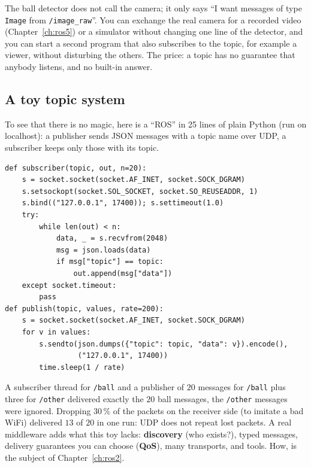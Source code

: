 \begin{keyidea}
The ball detector does not call the camera; it only says ``I want messages of type \verb!Image! from \verb!/image_raw!''. You can exchange the real camera for a recorded video (Chapter~\ref{ch:ros5}) or a simulator without changing one line of the detector, and you can start a second program that also subscribes to the topic, for example a viewer, without disturbing the others. The price: a topic has no guarantee that anybody listens, and no built-in answer.
\end{keyidea}

\subsection*{A toy topic system}
To see that there is no magic, here is a ``ROS'' in 25 lines of plain Python (run on localhost): a publisher sends JSON messages with a topic name over UDP, a subscriber keeps only those with its topic.
\begin{verbatim}
def subscriber(topic, out, n=20):
    s = socket.socket(socket.AF_INET, socket.SOCK_DGRAM)
    s.setsockopt(socket.SOL_SOCKET, socket.SO_REUSEADDR, 1)
    s.bind(("127.0.0.1", 17400)); s.settimeout(1.0)
    try:
        while len(out) < n:
            data, _ = s.recvfrom(2048)
            msg = json.loads(data)
            if msg["topic"] == topic:
                out.append(msg["data"])
    except socket.timeout:
        pass
def publish(topic, values, rate=200):
    s = socket.socket(socket.AF_INET, socket.SOCK_DGRAM)
    for v in values:
        s.sendto(json.dumps({"topic": topic, "data": v}).encode(),
                 ("127.0.0.1", 17400))
        time.sleep(1 / rate)
\end{verbatim}
A subscriber thread for \verb!/ball! and a publisher of $20$ messages for \verb!/ball! plus three for \verb!/other! delivered exactly the $20$ ball messages, the \verb!/other! messages were ignored. Dropping $30\,\%$ of the packets on the receiver side (to imitate a bad WiFi) delivered $13$ of $20$ in one run: UDP does not repeat lost packets. A real middleware adds what this toy lacks: \textbf{discovery} (who exists?), typed messages, delivery guarantees you can choose (\textbf{QoS}), many transports, and tools. How, is the subject of Chapter~\ref{ch:ros2}.

